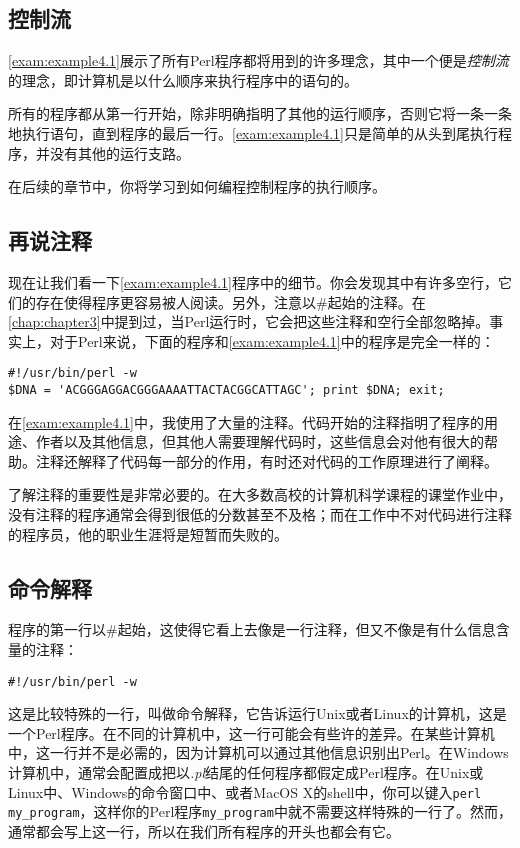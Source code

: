 \subsection{控制流}
\autoref{exam:example4.1}展示了所有Perl程序都将用到的许多理念，其中一个便是\textit{控制流}的理念，即计算机是以什么顺序来执行程序中的语句的。

所有的程序都从第一行开始，除非明确指明了其他的运行顺序，否则它将一条一条地执行语句，直到程序的最后一行。\autoref{exam:example4.1}只是简单的从头到尾执行程序，并没有其他的运行支路。

在后续的章节中，你将学习到如何编程控制程序的执行顺序。

\subsection{再说注释}
现在让我们看一下\autoref{exam:example4.1}程序中的细节。你会发现其中有许多空行，它们的存在使得程序更容易被人阅读。另外，注意以\#起始的注释。在\autoref{chap:chapter3}中提到过，当Perl运行时，它会把这些注释和空行全部忽略掉。事实上，对于Perl来说，下面的程序和\autoref{exam:example4.1}中的程序是完全一样的：

\begin{lstlisting}
#!/usr/bin/perl -w
$DNA = 'ACGGGAGGACGGGAAAATTACTACGGCATTAGC'; print $DNA; exit;
\end{lstlisting}

在\autoref{exam:example4.1}中，我使用了大量的注释。代码开始的注释指明了程序的用途、作者以及其他信息，但其他人需要理解代码时，这些信息会对他有很大的帮助。注释还解释了代码每一部分的作用，有时还对代码的工作原理进行了阐释。

了解注释的重要性是非常必要的。在大多数高校的计算机科学课程的课堂作业中，没有注释的程序通常会得到很低的分数甚至不及格；而在工作中不对代码进行注释的程序员，他的职业生涯将是短暂而失败的。

\subsection{命令解释}
\label{sec:section4.2.3}
程序的第一行以\#起始，这使得它看上去像是一行注释，但又不像是有什么信息含量的注释：

\begin{lstlisting}
#!/usr/bin/perl -w
\end{lstlisting}

这是比较特殊的一行，叫做命令解释，它告诉运行Unix或者Linux的计算机，这是一个Perl程序。在不同的计算机中，这一行可能会有些许的差异。在某些计算机中，这一行并不是必需的，因为计算机可以通过其他信息识别出Perl。在Windows计算机中，通常会配置成把以\textit{.pl}结尾的任何程序都假定成Perl程序。在Unix或Linux中、Windows的命令窗口中、或者MacOS X的shell中，你可以键入\verb|perl my_program|，这样你的Perl程序\verb|my_program|中就不需要这样特殊的一行了。然而，通常都会写上这一行，所以在我们所有程序的开头也都会有它。

